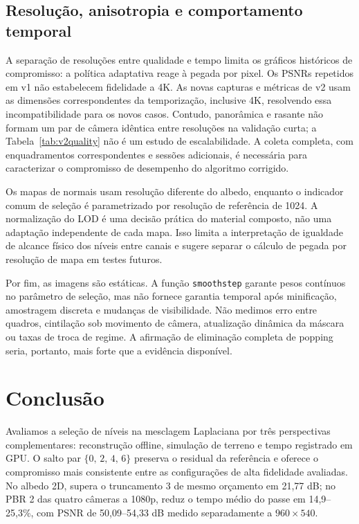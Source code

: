 \subsection{Resolução, anisotropia e comportamento temporal}
A separação de resoluções entre qualidade e tempo limita os gráficos históricos de compromisso: a política adaptativa reage à pegada por pixel. Os PSNRs repetidos em v1 não estabelecem fidelidade a 4K. As novas capturas e métricas de v2 usam as dimensões correspondentes da temporização, inclusive 4K, resolvendo essa incompatibilidade para os novos casos. Contudo, panorâmica e rasante não formam um par de câmera idêntica entre resoluções na validação curta; a Tabela~\ref{tab:v2quality} não é um estudo de escalabilidade. A coleta completa, com enquadramentos correspondentes e sessões adicionais, é necessária para caracterizar o compromisso de desempenho do algoritmo corrigido.

Os mapas de normais usam resolução diferente do albedo, enquanto o indicador comum de seleção é parametrizado por resolução de referência de 1024. A normalização do LOD é uma decisão prática do material composto, não uma adaptação independente de cada mapa. Isso limita a interpretação de igualdade de alcance físico dos níveis entre canais e sugere separar o cálculo de pegada por resolução de mapa em testes futuros.

Por fim, as imagens são estáticas. A função \texttt{smoothstep} garante pesos contínuos no parâmetro de seleção, mas não fornece garantia temporal após minificação, amostragem discreta e mudanças de visibilidade. Não medimos erro entre quadros, cintilação sob movimento de câmera, atualização dinâmica da máscara ou taxas de troca de regime. A afirmação de eliminação completa de popping seria, portanto, mais forte que a evidência disponível.

\section{Conclusão}
Avaliamos a seleção de níveis na mesclagem Laplaciana por três perspectivas complementares: reconstrução offline, simulação de terreno e tempo registrado em GPU. O salto par $\{0,\,2,\,4,\,6\}$ preserva o residual da referência e oferece o compromisso mais consistente entre as configurações de alta fidelidade avaliadas. No albedo 2D, supera o truncamento 3 de mesmo orçamento em 21,77 dB; no PBR 2 das quatro câmeras a 1080p, reduz o tempo médio do passe em 14,9--25,3\%, com PSNR de 50,09--54,33 dB medido separadamente a $960\times540$.

